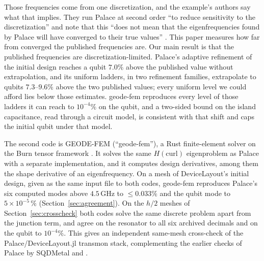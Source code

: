 \documentclass{anvil-paper}
\begin{document}
Those frequencies come from one discretization, and the example's authors
say what that implies. They run Palace at second order ``to reduce
sensitivity to the discretization'' and note that this ``does not mean that
the eigenfrequencies found by Palace will have converged to their true
values'' \citep{devicelayout-example}. This paper measures
how far from converged the published frequencies are. Our
main result is that the published frequencies are discretization-limited.
Palace's adaptive refinement of the initial design reaches a qubit $7.0\%$ above the
published value without extrapolation, and its uniform ladders, in two
refinement families, extrapolate to qubits $7.3$--$9.6\%$ above the two
published values; every uniform level we could afford lies below those
estimates. geode-fem reproduces every
level of those ladders it can reach to $10^{-4}\%$ on the qubit, and a
two-sided bound on the island capacitance, read through a circuit model, is
consistent with that shift and caps the initial qubit under that model.

The second code is GEODE-FEM (``geode-fem''), a Rust finite-element solver
on the Burn tensor framework \citep{burn}. It solves the same
$H(\mathrm{curl})$ eigenproblem as Palace with a separate implementation,
and it computes design derivatives, among them the shape derivative of an
eigenfrequency. On a mesh of DeviceLayout's initial design, given as the
same input file to both codes, geode-fem reproduces Palace's six computed
modes above $4.5$\,GHz to $\leq 0.033\%$ and the qubit mode to
$5\times10^{-5}\,\%$ (Section~\ref{sec:agreement}). On the $h/2$ meshes
of Section~\ref{sec:crosscheck} both codes solve the same discrete problem
apart from the junction term, and agree on the resonator to all six
archived decimals and on the qubit to $10^{-4}\%$. This gives an independent
same-mesh cross-check of the Palace/DeviceLayout.jl transmon stack,
complementing the earlier checks of Palace by SQDMetal
\citep{sommers2025open} and \citet{ye2025electromagnetic}.
\end{document}
